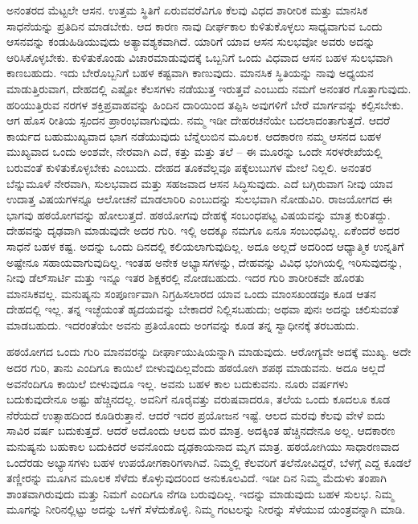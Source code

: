 ಅನಂತರದ ಮೆಟ್ಟಲೇ ಆಸನ. ಉತ್ತಮ ಸ್ಥಿತಿಗೆ ಏರುವವರೆವಿಗೂ ಕೆಲವು ವಿಧದ ಶಾರೀರಿಕ ಮತ್ತು ಮಾನಸಿಕ ಸಾಧನೆಯನ್ನು ಪ್ರತಿದಿನ ಮಾಡಬೇಕು. ಆದ ಕಾರಣ ನಾವು ದೀರ್ಘಕಾಲ ಕುಳಿತುಕೊಳ್ಳಲು ಸಾಧ್ಯವಾಗುವ ಒಂದು ಆಸನವನ್ನು ಕಂಡುಹಿಡಿಯುವುದು ಅತ್ಯಾವಶ್ಯಕವಾಗಿದೆ. ಯಾರಿಗೆ ಯಾವ ಆಸನ ಸುಲಭವೋ ಅವರು ಅದನ್ನು ಆರಿಸಿಕೊಳ್ಳಬೇಕು. ಕುಳಿತುಕೊಂಡು ವಿಚಾರಮಾಡುವುದಕ್ಕೆ ಒಬ್ಬನಿಗೆ ಒಂದು ವಿಧವಾದ ಆಸನ ಬಹಳ ಸುಲಭವಾಗಿ ಕಾಣಬಹುದು. ಇದು ಬೇರೊಬ್ಬನಿಗೆ ಬಹಳ ಕಷ್ಟವಾಗಿ ಕಾಣುವುದು. ಮಾನಸಿಕ ಸ್ಥಿತಿಯನ್ನು ನಾವು ಅಧ್ಯಯನ ಮಾಡುತ್ತಿರುವಾಗ, ದೇಹದಲ್ಲಿ ಎಷ್ಟೋ ಕೆಲಸಗಳು ನಡೆಯುತ್ತ ಇರುತ್ತವೆ ಎಂಬುದು ನಮಗೆ ಅನಂತರ ಗೊತ್ತಾಗುವುದು. ಹರಿಯುತ್ತಿರುವ ನರಗಳ ಶಕ್ತಿಪ್ರವಾಹವನ್ನು ಹಿಂದಿನ ದಾರಿಯಿಂದ ತಪ್ಪಿಸಿ ಅವುಗಳಿಗೆ ಬೇರೆ ಮಾರ್ಗವನ್ನು ಕಲ್ಪಿಸಬೇಕು. ಆಗ ಹೊಸ ರೀತಿಯ ಸ್ಪಂದನ ಪ್ರಾರಂಭವಾಗುವುದು. ನಮ್ಮ ಇಡೀ ದೇಹರಚನೆಯೇ ಬದಲಾದಂತಾಗುತ್ತದೆ. ಆದರೆ ಕಾರ್ಯದ ಬಹುಮುಖ್ಯವಾದ ಭಾಗ ನಡೆಯುವುದು ಬೆನ್ನೆಲುಬಿನ ಮೂಲಕ. ಆದಕಾರಣ ನಮ್ಮ ಆಸನದ ಬಹಳ ಮುಖ್ಯವಾದ ಒಂದು ಅಂಶವೇ, ನೇರವಾಗಿ ಎದೆ, ಕತ್ತು ಮತ್ತು ತಲೆ – ಈ ಮೂರನ್ನು ಒಂದೇ ಸರಳರೇಖೆಯಲ್ಲಿ ಬರುವಂತೆ ಕುಳಿತುಕೊಳ್ಳಬೇಕು ಎಂಬುದು. ದೇಹದ ತೂಕವೆಲ್ಲವೂ ಪಕ್ಕೆಲುಬುಗಳ ಮೇಲೆ ನಿಲ್ಲಲಿ. ಅನಂತರ ಬೆನ್ನುಮೂಳೆ ನೇರವಾಗಿ, ಸುಲಭವಾದ ಮತ್ತು ಸಹಜವಾದ ಆಸನ ಸಿದ್ಧಿಸುವುದು. ಎದೆ ಬಗ್ಗಿರುವಾಗ ನೀವು ಯಾವ ಉದಾತ್ತ ವಿಷಯಗಳನ್ನೂ ಆಲೋಚನೆ ಮಾಡಲಾರಿರಿ ಎಂಬುದನ್ನು ಸುಲಭವಾಗಿ ನೋಡುವಿರಿ. ರಾಜಯೋಗದ ಈ ಭಾಗವು ಹಠಯೋಗವನ್ನು ಹೋಲುತ್ತದೆ. ಹಠಯೋಗವು ದೇಹಕ್ಕೆ ಸಂಬಂಧಪಟ್ಟ ವಿಷಯವನ್ನು ಮಾತ್ರ ಕುರಿತದ್ದು. ದೇಹವನ್ನು ದೃಢವಾಗಿ ಮಾಡುವುದೇ ಅದರ ಗುರಿ. ಇಲ್ಲಿ ಅದಕ್ಕೂ ನಮಗೂ ಏನೂ ಸಂಬಂಧವಿಲ್ಲ. ಏಕೆಂದರೆ ಅದರ ಸಾಧನೆ ಬಹಳ ಕಷ್ಟ. ಅದನ್ನು ಒಂದು ದಿನದಲ್ಲಿ ಕಲಿಯಲಾಗುವುದಿಲ್ಲ. ಅದೂ ಅಲ್ಲದೆ ಅದರಿಂದ ಆಧ್ಯಾತ್ಮಿಕ ಉನ್ನತಿಗೆ ಅಷ್ಟೇನೂ ಸಹಾಯವಾಗುವುದಿಲ್ಲ. ಇಂತಹ ಅನೇಕ ಅಭ್ಯಾಸಗಳನ್ನು, ದೇಹವನ್ನು ವಿವಿಧ ಭಂಗಿಯಲ್ಲಿ ಇರಿಸುವುದನ್ನು, ನೀವು ಡೆಲ್​ಸಾರ್ಟಿ ಮತ್ತು ಇನ್ನೂ ಇತರ ಶಿಕ್ಷಕರಲ್ಲಿ ನೋಡಬಹುದು. ಇದರ ಗುರಿ ಶಾರೀರಿಕವೇ ಹೊರತು ಮಾನಸಿಕವಲ್ಲ. ಮನುಷ್ಯನು ಸಂಪೂರ್ಣವಾಗಿ ನಿಗ್ರಹಿಸಲಾರದ ಯಾವ ಒಂದು ಮಾಂಸಖಂಡವೂ ಕೂಡ ಆತನ ದೇಹದಲ್ಲಿ ಇಲ್ಲ. ತನ್ನ ಇಚ್ಛೆಯಂತೆ ಹೃದಯವನ್ನು ಬೇಕಾದರೆ ನಿಲ್ಲಿಸಬಹುದು; ಅಥವಾ ಪುನಃ ಅದನ್ನು ಚಲಿಸುವಂತೆ ಮಾಡಬಹುದು. ಇದರಂತೆಯೇ ಅವನು ಪ್ರತಿಯೊಂದು ಅಂಗವನ್ನು ಕೂಡ ತನ್ನ ಸ್ವಾಧೀನಕ್ಕೆ ತರಬಹುದು. 

ಹಠಯೋಗದ ಒಂದು ಗುರಿ ಮಾನವರನ್ನು ದೀರ್ಘಾಯುಷಿಯನ್ನಾಗಿ ಮಾಡುವುದು. ಆರೋಗ್ಯವೇ ಅದಕ್ಕೆ ಮುಖ್ಯ. ಅದೇ ಅದರ ಗುರಿ, ತಾನು ಎಂದಿಗೂ ಕಾಯಿಲೆ ಬೀಳುವುದಿಲ್ಲವೆಂದು ಹಠಯೋಗಿ ಶಪಥ ಮಾಡುವನು. ಅದೂ ಅಲ್ಲದೆ ಅವನೆಂದಿಗೂ ಕಾಯಿಲೆ ಬೀಳುವುದೂ ಇಲ್ಲ. ಅವನು ಬಹಳ ಕಾಲ ಬದುಕುವನು. ನೂರು ವರ್ಷಗಳು ಬದುಕುವುದೇನೂ ಅಷ್ಟು ಹೆಚ್ಚಿನದಲ್ಲ. ಅವನಿಗೆ ನೂರೈವತ್ತು ವರುಷವಾದರೂ, ತಲೆಯ ಒಂದು ಕೂದಲೂ ಕೂಡ ನೆರೆಯದೆ ಉತ್ಸಾಹದಿಂದ ಕೂಡಿರುತ್ತಾನೆ. ಆದರೆ ಇದರ ಪ್ರಯೋಜನ ಇಷ್ಟೆ. ಆಲದ ಮರವು ಕೆಲವು ವೇಳೆ ಐದು ಸಾವಿರ ವರ್ಷ ಬದುಕುತ್ತದೆ. ಆದರೆ ಅದೊಂದು ಆಲದ ಮರ ಮಾತ್ರ. ಅದಕ್ಕಿಂತ ಹೆಚ್ಚಿನದೇನೂ ಅಲ್ಲ. ಆದಕಾರಣ ಮನುಷ್ಯನು ಬಹುಕಾಲ ಬದುಕಿದರೆ ಅವನೊಂದು ದೃಢಕಾಯನಾದ ಮೃಗ ಮಾತ್ರ. ಹಠಯೋಗಿಯು ಸಾಧಾರಣವಾದ ಒಂದೆರಡು ಅಭ್ಯಾಸಗಳು ಬಹಳ ಉಪಯೋಗಕಾರಿಗಳಾಗಿವೆ. ನಿಮ್ಮಲ್ಲಿ ಕೆಲವರಿಗೆ ತಲೆನೋವಿದ್ದರೆ, ಬೆಳಗ್ಗೆ ಎದ್ದ ಕೂಡಲೆ ತಣ್ಣೀರನ್ನು ಮೂಗಿನ ಮೂಲಕ ಸೆಳೆದು ಕೊಳ್ಳುವುದರಿಂದ ಅನುಕೂಲವಿದೆ. ಇಡೀ ದಿನ ನಿಮ್ಮ ಮೆದುಳು ತಂಪಾಗಿ ಶಾಂತವಾಗಿರುವುದು ಮತ್ತು ನಿಮಗೆ ಎಂದಿಗೂ ನೆಗಡಿ ಬರುವುದಿಲ್ಲ. ಇದನ್ನು ಮಾಡುವುದು ಬಹಳ ಸುಲಭ. ನಿಮ್ಮ ಮೂಗನ್ನು ನೀರಿನಲ್ಲಿಟ್ಟು ಅದನ್ನು ಒಳಗೆ ಸೆಳೆದುಕೊಳ್ಳಿ. ನಿಮ್ಮ ಗಂಟಲನ್ನು ನೀರನ್ನು ಸೆಳೆಯುವ ಯಂತ್ರವನ್ನಾಗಿ ಮಾಡಿ. 

